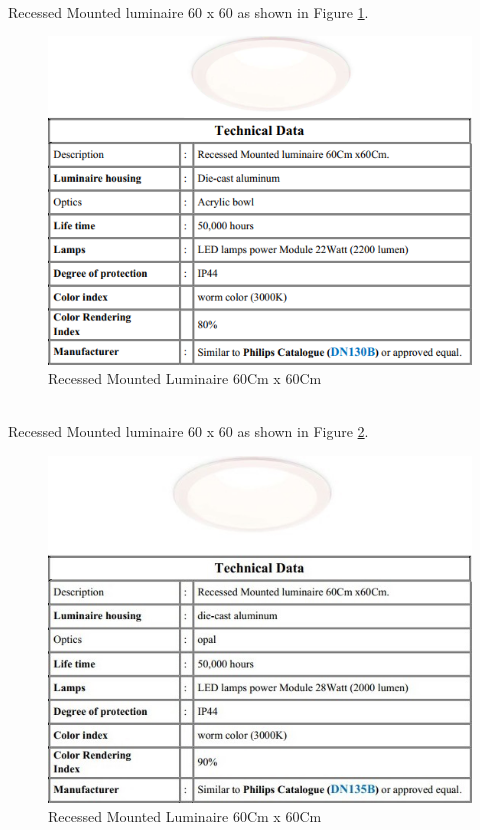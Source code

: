 \documentclass[12pt,fleqn]{book} %
\begin{document}
\newpage
\\Recessed Mounted luminaire 60 x 60 as shown in Figure \ref{fig:fikry 12}.
\begin{figure}[!h]
    \centering
    \includegraphics[width=1\linewidth]{fikry 12.png}
    \caption{Recessed Mounted Luminaire 60Cm x 60Cm}
    \label{fig:fikry 12}
\end{figure}
\newpage
\\Recessed Mounted luminaire 60 x 60 as shown in Figure \ref{fig:fikry 13}.
\begin{figure}[!h]
    \centering
    \includegraphics[width=1\linewidth]{fikry 13.png}
    \caption{Recessed Mounted Luminaire 60Cm x 60Cm}
    \label{fig:fikry 13}
\end{figure}
\end{document}
